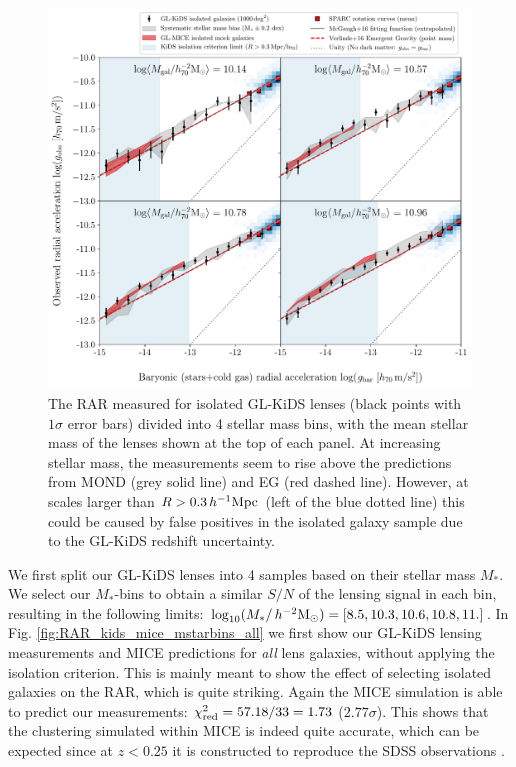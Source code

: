 \documentclass[usenatbib]{mnras}
\newcommand{\hmsun}{\,h^{-2} {\rm M_\odot}}
\newcommand{\hMpc}{\, h^{-1}{\rm{Mpc}} }
\newcommand{\un}[1]{_{\rm #1}}
\begin{document}
\begin{figure}
	\includegraphics[width=\textwidth]{Figures/RAR_KiDS+MICE+Verlinde_4-massbins_isolated.pdf}
	\caption{The RAR measured for isolated GL-KiDS lenses (black points with $1\sigma$ error bars) divided into 4 stellar mass bins, with the mean stellar mass of the lenses shown at the top of each panel. At increasing stellar mass, the measurements seem to rise above the predictions from MOND (grey solid line) and EG (red dashed line). However, at scales larger than $R > 0.3 \hMpc$ (left of the blue dotted line) this could be caused by false positives in the isolated galaxy sample due to the GL-KiDS redshift uncertainty.}
	\label{fig:RAR_kids_mice_mstarbins}
\end{figure}

We first split our GL-KiDS lenses into 4 samples based on their stellar mass $M_*$. We select our $M_*$-bins to obtain a similar $S/N$ of the lensing signal in each bin, resulting in the following limits: $\log_{10}(M_*/\hmsun) = [8.5,10.3,10.6,10.8,11.]$. In Fig. \ref{fig:RAR_kids_mice_mstarbins_all} we first show our GL-KiDS lensing measurements and MICE predictions for \emph{all} lens galaxies, without applying the isolation criterion. This is mainly meant to show the effect of selecting isolated galaxies on the RAR, which is quite striking. Again the MICE simulation is able to predict our measurements: $\chi\un{red}^2 = 57.18 / 33 = 1.73$ ($2.77 \sigma$). This shows that the clustering simulated within MICE is indeed quite accurate, which can be expected since at $z<0.25$ it is constructed to reproduce the SDSS observations \cite[]{zehavi2011}.
\end{document}
